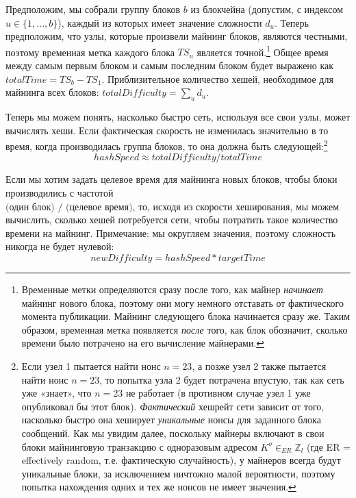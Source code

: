 Предположим, мы собрали группу блоков $b$ из блокчейна (допустим, с индексом $u \in \{1,...,b\}$), каждый из которых имеет значение сложности $d_u$. Теперь предположим, что узлы, которые произвели майнинг блоков, являются честными, поэтому временная метка каждого блока ${TS}_u$ является точной.\footnote{Временные метки определяются сразу после того, как майнер {\em начинает} майнинг нового блока, поэтому они могу немного отставать от фактического момента публикации. Майнинг следующего блока начинается сразу же. Таким образом, временная метка появляется {\em после} того, как блок обозначит, сколько времени было потрачено на его вычисление майнерами.} Общее время между самым первым блоком и самым последним блоком будет выражено как $\mathit{totalTime} = {TS}_b - {TS}_1$. Приблизительное количество хешей, необходимое для майнинга всех блоков: $\mathit{totalDifficulty} = \sum_u d_u$.

Теперь мы можем понять, насколько быстро сеть, используя все свои узлы, может вычислять хеши. Если фактическая скорость не изменилась значительно в то время, когда производилась группа блоков, то она должна быть следующей:\footnote{Если узел 1 пытается найти нонс $n = 23$, а позже узел 2 также пытается найти нонс $n = 23$, то попытка узла 2 будет потрачена впустую, так как сеть уже «знает», что $n = 23$ не работает (в противном случае узел 1 уже опубликовал бы этот блок). {\em Фактический} хешрейт сети зависит от того, насколько быстро она хеширует {\em уникальные} нонсы для заданного блока сообщений. Как мы увидим далее, поскольку майнеры включают в свои блоки майнинговую транзакцию с одноразовым адресом $K^o \in_{ER} \mathbb{Z}_l$ (где ER = effectively random, т.е. фактическую случайность), у майнеров всегда будут уникальные блоки, за исключением ничтожно малой вероятности, поэтому попытка нахождения одних и тех же нонсов не имеет значения.}%
\[\mathit{hashSpeed} \approx \mathit{totalDifficulty}/\mathit{totalTime}\]

Если мы хотим задать целевое время для майнинга новых блоков, чтобы блоки производились с частотой\\ \(\textrm{(один блок) / (целевое время)}\), то, исходя из скорости хеширования, мы можем вычислить, сколько хешей потребуется сети, чтобы потратить такое количество времени на майнинг. Примечание: мы округляем значения, поэтому сложность никогда не будет нулевой:%
\[\mathit{newDifficulty} = \mathit{hashSpeed}*\mathit{targetTime}\]

